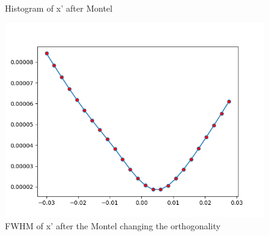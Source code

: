 \begin{figure}[]
%
\centering
%
\quad
%
%
\caption{Histogram of x' after Montel}
%
\label{fig: incidence angle}
%
\end{figure}
\begin{figure}
%
\centering
%
\includegraphics[width=.6\textwidth]{Immagini/Chapter4/FWHMChangingOrt}
%
\caption{FWHM of x' after the Montel changing the orthogonality}
%
\label{fig:FWHM changing orthogonality}
%
\end{figure}

